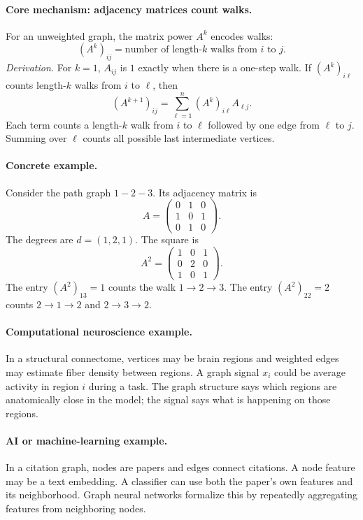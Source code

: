 \paragraph{Core mechanism: adjacency matrices count walks.}
For an unweighted graph, the matrix power \(A^k\) encodes walks:
\[
(A^k)_{ij}=\text{number of length-}k\text{ walks from }i\text{ to }j.
\]
\emph{Derivation.} For \(k=1\), \(A_{ij}\) is \(1\) exactly when there is a one-step walk. If \((A^k)_{i\ell}\) counts length-\(k\) walks from \(i\) to \(\ell\), then
\[
(A^{k+1})_{ij}=\sum_{\ell=1}^n (A^k)_{i\ell}A_{\ell j}.
\]
Each term counts a length-\(k\) walk from \(i\) to \(\ell\) followed by one edge from \(\ell\) to \(j\). Summing over \(\ell\) counts all possible last intermediate vertices.

\paragraph{Concrete example.}
Consider the path graph \(1-2-3\). Its adjacency matrix is
\[
A=
\begin{pmatrix}
0&1&0\\
1&0&1\\
0&1&0
\end{pmatrix}.
\]
The degrees are \(d=(1,2,1)\). The square is
\[
A^2=
\begin{pmatrix}
1&0&1\\
0&2&0\\
1&0&1
\end{pmatrix}.
\]
The entry \((A^2)_{13}=1\) counts the walk \(1\to2\to3\). The entry \((A^2)_{22}=2\) counts \(2\to1\to2\) and \(2\to3\to2\).

\paragraph{Computational neuroscience example.}
In a structural connectome, vertices may be brain regions and weighted edges may estimate fiber density between regions. A graph signal \(x_i\) could be average activity in region \(i\) during a task. The graph structure says which regions are anatomically close in the model; the signal says what is happening on those regions.

\paragraph{AI or machine-learning example.}
In a citation graph, nodes are papers and edges connect citations. A node feature may be a text embedding. A classifier can use both the paper's own features and its neighborhood. Graph neural networks formalize this by repeatedly aggregating features from neighboring nodes.

